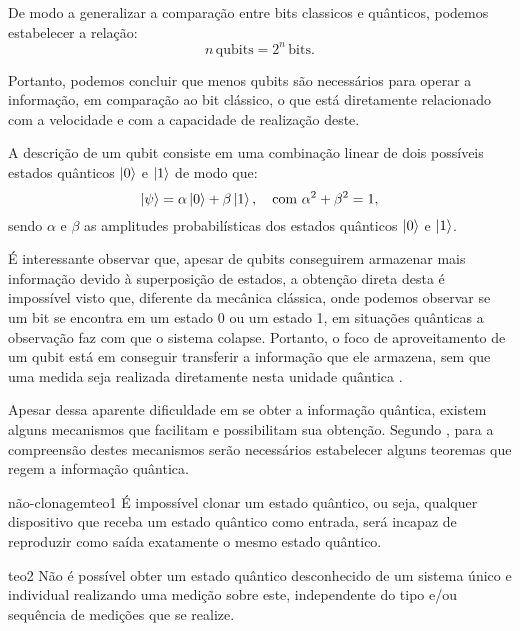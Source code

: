 \documentclass[12pt,oneside,brazil,hidelinks,article,sumario=tradicional,a4paper]{abntex2}
\begin{document}
De modo a generalizar a comparação entre bits classicos e quânticos, podemos estabelecer a relação:
\begin{equation} \label{bitvsqubit}
n\, \text{qubits} = 2^{n}\,\text{bits}.
\end{equation}

Portanto, podemos concluir que menos qubits são necessários para operar a informação, em comparação ao bit clássico, o que está diretamente relacionado com a velocidade e com a capacidade de realização deste.

A descrição de um qubit consiste em uma combinação linear de dois possíveis estados quânticos $\ket{0}$ e $\ket{1}$ de modo que:
\begin{equation} \label{comblinearqubit}
 \ket{\psi} = \alpha \ket{0} + \beta \ket{1}, \quad \text{com } \alpha^{2} + \beta^{2} = 1,
\end{equation}
sendo $\alpha$ e $\beta$ as amplitudes probabilísticas dos estados quânticos $\ket{0}$ e $\ket{1}$.

É interessante observar que, apesar de qubits conseguirem armazenar mais informação devido à superposição de estados, a obtenção direta desta é impossível visto que, diferente da mecânica clássica, onde podemos observar se um bit se encontra em um estado 0 ou um estado 1, em situações quânticas a observação faz com que o sistema colapse. Portanto, o foco de aproveitamento de um qubit está em conseguir transferir a informação que ele armazena, sem que uma medida seja realizada diretamente nesta unidade quântica \cite{chuang}.

Apesar dessa aparente dificuldade em se obter a informação quântica, existem alguns mecanismos que facilitam e possibilitam sua obtenção. Segundo \textcite{materialdidaticomecquantica}, para a compreensão destes mecanismos serão necessários estabelecer alguns teoremas que regem a informação quântica.

\begin{theo}{não-clonagem}{teo1}
É impossível clonar um estado quântico, ou seja, qualquer dispositivo que receba um estado quântico como entrada, será incapaz de reproduzir como saída exatamente o mesmo estado quântico.
\end{theo}

\begin{theo}{}{teo2}
Não é possível obter um estado quântico desconhecido de um sistema único e individual realizando uma medição sobre este, independente do tipo e/ou sequência de medições que se realize.
\end{theo}
\end{document}
